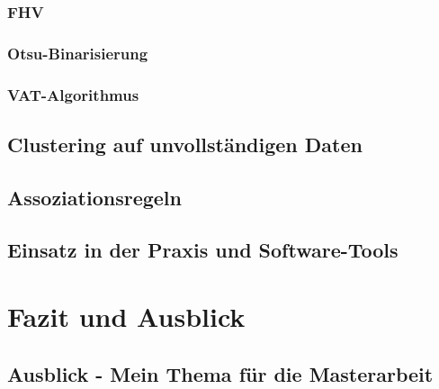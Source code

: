 \documentclass[11pt,fleqn]{book}
\begin{document}
\subsection{FHV}
\subsection{Otsu-Binarisierung}
\subsection{VAT-Algorithmus}

\section{Clustering auf unvollständigen Daten}

\section{Assoziationsregeln}
\section{Einsatz in der Praxis und Software-Tools}




\chapter{Fazit und Ausblick}
\section{Ausblick - Mein Thema für die Masterarbeit}


\printbibliography
\vfill
\end{document}
